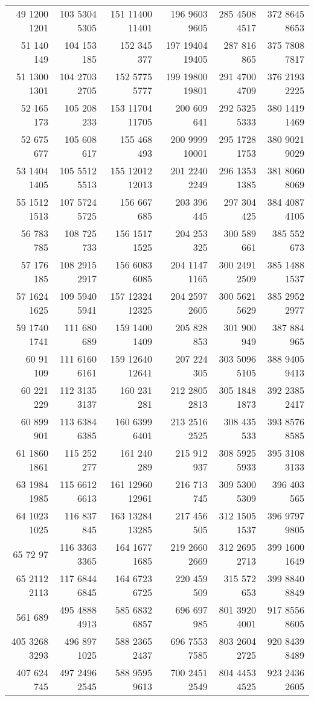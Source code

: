 \begin{center}
\begin{longtable}[c]{*{6}{r}}
49 1200 1201&103 5304 5305&151 11400 11401&196 9603 9605&285 4508 4517&372 8645 8653\\
51 140 149&104 153 185&152 345 377&197 19404 19405&287 816 865&375 7808 7817\\
51 1300 1301&104 2703 2705&152 5775 5777&199 19800 19801&291 4700 4709&376 2193 2225\\
52 165 173&105 208 233&153 11704 11705&200 609 641&292 5325 5333&380 1419 1469\\
52 675 677&105 608 617&155 468 493&200 9999 10001&295 1728 1753&380 9021 9029\\
53 1404 1405&105 5512 5513&155 12012 12013&201 2240 2249&296 1353 1385&381 8060 8069\\
55 1512 1513&107 5724 5725&156 667 685&203 396 445&297 304 425&384 4087 4105\\
56 783 785&108 725 733&156 1517 1525&204 253 325&300 589 661&385 552 673\\
57 176 185&108 2915 2917&156 6083 6085&204 1147 1165&300 2491 2509&385 1488 1537\\
57 1624 1625&109 5940 5941&157 12324 12325&204 2597 2605&300 5621 5629&385 2952 2977\\
59 1740 1741&111 680 689&159 1400 1409&205 828 853&301 900 949&387 884 965\\
60 91 109&111 6160 6161&159 12640 12641&207 224 305&303 5096 5105&388 9405 9413\\
60 221 229&112 3135 3137&160 231 281&212 2805 2813&305 1848 1873&392 2385 2417\\
60 899 901&113 6384 6385&160 6399 6401&213 2516 2525&308 435 533&393 8576 8585\\
61 1860 1861&115 252 277&161 240 289&215 912 937&308 5925 5933&395 3108 3133\\
63 1984 1985&115 6612 6613&161 12960 12961&216 713 745&309 5300 5309&396 403 565\\
64 1023 1025&116 837 845&163 13284 13285&217 456 505&312 1505 1537&396 9797 9805\\
65 72 97&116 3363 3365&164 1677 1685&219 2660 2669&312 2695 2713&399 1600 1649\\
65 2112 2113&117 6844 6845&164 6723 6725&220 459 509&315 572 653&399 8840 8849\\
\newpage
400 561 689&495 4888 4913&585 6832 6857&696 697 985&801 3920 4001&917 8556 8605\\
405 3268 3293&496 897 1025&588 2365 2437&696 7553 7585&803 2604 2725&920 8439 8489\\
407 624 745&497 2496 2545&588 9595 9613&700 2451 2549&804 4453 4525&923 2436 2605\\

\end{longtable}
\end{center}
